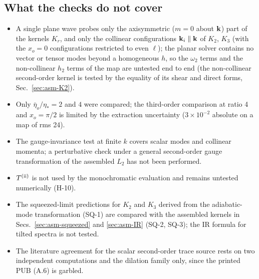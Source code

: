 \subsection{What the checks do not cover}
\label{sec:check_gaps}
\begin{itemize}\itemsep2pt
\item A single plane wave probes only the axisymmetric ($m=0$ about $\mathbf k$) part of the kernels $K_r$, and only the collinear configurations
$\mathbf k_i\parallel\mathbf k$ of $K_2$, $K_3$ (with the $x_o=0$ configurations restricted to even $\ell$); the planar solver contains no vector or tensor
modes beyond a homogeneous $h$, so the $\omega_2$ terms and the non-collinear $h_2$ terms of the map are untested end to end (the
non-collinear second-order kernel is tested by the equality of its shear and direct forms, Sec.~\ref{sec:asm-K2}).
\item Only $\bar\eta_o/\eta_*=2$ and $4$ were compared; the third-order comparison at ratio 4 and $x_o=\pi/2$ is limited by the extraction
uncertainty ($3\times10^{-2}$ absolute on a map of rms 24).
\item The gauge-invariance test at finite $k$ covers scalar modes and collinear momenta; a perturbative check under a general second-order
gauge transformation of the assembled $L_2$ has not been performed.
\item $T^{\rm(ii)}$ is not used by the monochromatic evaluation and remains untested numerically (H-10).
\item The squeezed-limit predictions for $K_2$ and $K_3$ derived from the adiabatic-mode transformation (SQ-1) are compared with the
assembled kernels in Secs.~\ref{sec:asm-squeezed} and \ref{sec:asm-IR} (SQ-2, SQ-3); the IR formula for tilted spectra is not tested.
\item The literature agreement for the scalar second-order trace source rests on two independent computations and the dilation family only,
since the printed PUB (A.6) is garbled.
\end{itemize}
